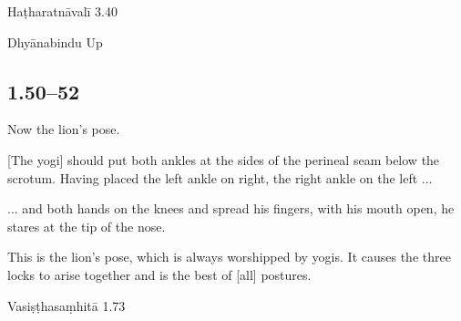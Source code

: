 \begin{ekdosis}
\begin{testimonia}[hp01_049]
Haṭharatnāvalī 3.40

\begin{versinnote}
\end{versinnote}

Dhyānabindu Up

\begin{versinnote}
\end{versinnote}

\end{testimonia}


\subsection*{1.50--52}
\begin{translation}[hp01_050]
Now the lion’s pose.

[The yogi] should put both ankles at the sides of the perineal seam below the scrotum. Having placed the left ankle on right, the right ankle on the left ...
\end{translation}

\begin{translation}[hp01_051]
... and both hands on the knees and spread his fingers, with his mouth open, he stares at the tip of the nose.
\end{translation}

\begin{translation}[hp01_052]
This is the lion’s pose, which is always worshipped by yogis. It causes the three locks to arise together and is the best of [all] postures.
\end{translation}

\begin{sources}[hp01_050]
Vasiṣṭhasaṃhitā 1.73

\begin{versinnote}
\end{versinnote}


\end{sources}
\end{ekdosis}
